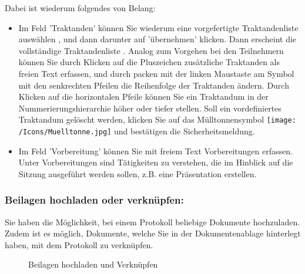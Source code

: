 Dabei ist wiederum folgendes von Belang:

\begin{itemize}
\item 
Im Feld 'Traktanden' können Sie wiederum eine vorgefertigte Traktandenliste auswählen , und dann darunter auf 'übernehmen'  klicken. Dann erscheint die vollständige Traktandenliste . Analog zum Vorgehen bei den Teilnehmern können Sie durch Klicken auf die Pluszeichen  zusätzliche Traktanden als freien Text erfassen, und durch packen mit der linken Maustaste am Symbol mit den senkrechten Pfeilen  die Reihenfolge der Traktanden ändern. Durch Klicken auf die horizontalen Pfeile  können Sie ein Traktandum in der Nummerierungshierarchie höher oder tiefer stellen. Soll ein vordefiniertes Traktandum gelöscht werden, klicken Sie auf das Mülltonnensymbol \texttt{[image: /Icons/Muelltonne.jpg]}  und bestätigen die Sicherheitsmeldung.
\item 
Im Feld 'Vorbereitung' können Sie mit freiem Text Vorbereitungen  erfassen. Unter Vorbereitungen sind Tätigkeiten zu verstehen, die im Hinblick auf die Sitzung ausgeführt werden sollen, z.B. eine Präsentation erstellen.
\end{itemize}

\subsubsection{Beilagen hochladen oder verknüpfen:}
Sie haben die Möglichkeit, bei einem Protokoll beliebige Dokumente hochzuladen. Zudem ist es möglich, Dokumente, welche Sie in der Dokumentenablage hinterlegt haben, mit dem Protokoll zu verknüpfen.  

\vspace{\baselineskip}

\begin{figure}[H]
\caption{Beilagen hochladen und Verknüpfen}
\end{figure}

